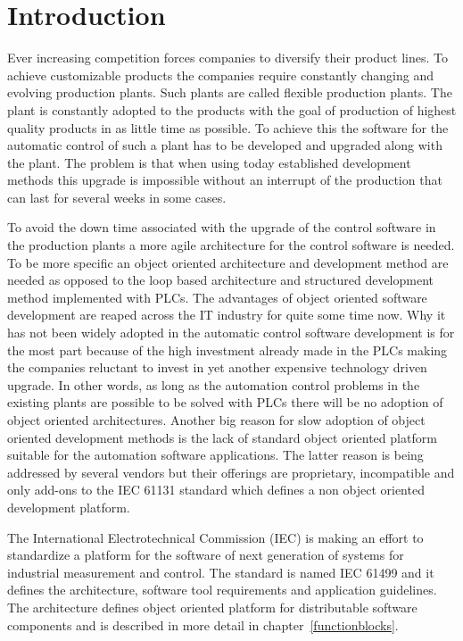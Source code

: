 
\chapter{Introduction}
\label{introduction}

Ever increasing competition forces companies to diversify
their product lines. To achieve customizable products the
companies require constantly changing and evolving
production plants. Such plants are called flexible
production plants. The plant is constantly adopted to the
products with the goal of production of highest quality
products in as little time as possible. To achieve this the
software for the automatic control of such a plant has to be
developed and upgraded along with the plant. The problem is
that when using today established development methods this
upgrade is impossible without an interrupt of the production
that can last for several weeks in some cases.

To avoid the down time associated with the upgrade of the
control software in the production plants a more agile
architecture for the control software is needed. To be more
specific an object oriented architecture and development
method are needed as opposed to the loop based architecture
and structured development method implemented with PLCs. The
advantages of object oriented software development are
reaped across the IT industry for quite some time now. Why
it has not been widely adopted in the automatic control
software development is for the most part because of the
high investment already made in the PLCs making the
companies reluctant to invest in yet another expensive
technology driven upgrade. In other words, as long as the
automation control problems in the existing plants are
possible to be solved with PLCs there will be no adoption of
object oriented architectures. Another big reason for slow
adoption of object oriented development methods is the lack
of standard object oriented platform suitable for the
automation software applications. The latter reason is being
addressed by several vendors but their offerings are
proprietary, incompatible and only add-ons to the IEC 61131
standard which defines a non object oriented development
platform.




The International Electrotechnical Commission (IEC) is making
an effort to standardize a platform for the software of next
generation of systems for industrial measurement and
control. The standard is named IEC 61499 and it defines the
architecture, software tool requirements and application
guidelines. The architecture defines object oriented
platform for distributable software components and is
described in more detail in chapter~\ref{functionblocks}.

